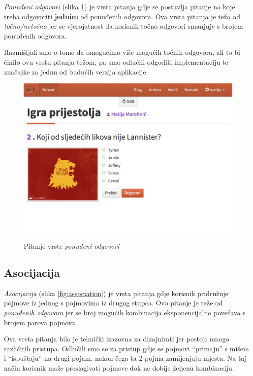 \documentclass{scrreprt}
\begin{document}
\emph{Ponuđeni odgovori} (slika \ref{fig:choice}) je vrsta pitanja gdje se
postavlja pitanje na koje treba odgovoriti \textbf{jednim} od ponuđenih
odgovora. Ova vrsta pitanja je teža od \emph{točno/netočno} jer se vjerojatnost
da korisnik točno odgovori smanjuje s brojem ponuđenih odgovora.

Razmišljali smo o tome da omogućimo više mogućih točnih odgovora, ali to bi
činilo ovu vrstu pitanja težom, pa smo odlučili odgoditi implementaciju te
značajke za jednu od budućih verzija aplikacije.

\begin{figure}[H]
  \includegraphics[width=\textwidth, clip=true, trim=0 5cm 0 0, fbox]{student/choice_question}
  \caption{Pitanje vrste \emph{ponuđeni odgovori}}
  \label{fig:choice}
\end{figure}

\subsection{Asocijacija}

\emph{Asocijacija} (slika \ref{fig:association}) je vrsta pitanja gdje korisnik
pridružuje pojmove iz jednog s pojmovima iz drugog stupca. Ovo pitanje je teže
od \emph{ponuđenih odgovora} jer se broj mogućih kombinacija eksponencijalno
povećava s brojem parova pojmova.

Ova vrsta pitanja bila je tehnički izazovna za dizajnirati jer postoji mnogo
različitih pristupa. Odlučili smo se za pristup gdje se pojmovi ``primaju'' s
mišem i ``ispuštaju'' na drugi pojam, nakon čega ta 2 pojma zamijenjuju mjesta.
Na taj način korisnik može preslagivati pojmove dok ne dobije željenu
kombinaciju.
\end{document}
